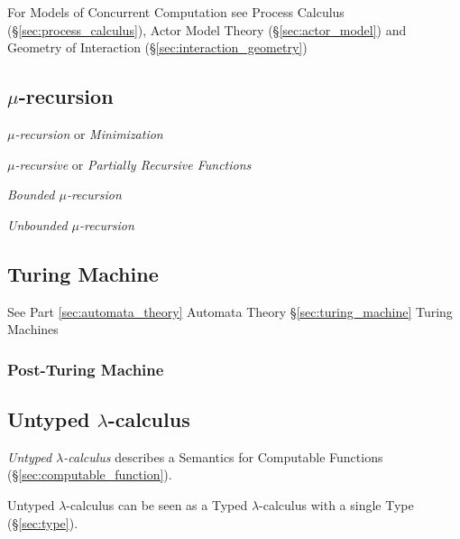 \fist For Models of Concurrent Computation see Process Calculus
(\S\ref{sec:process_calculus}), Actor Model Theory
(\S\ref{sec:actor_model}) and Geometry of Interaction
(\S\ref{sec:interaction_geometry})



\subsection{$\mu$-recursion}\label{sec:mu_recursion}

\emph{$\mu$-recursion} or \emph{Minimization}

\emph{$\mu$-recursive} or \emph{Partially Recursive Functions}

\emph{Bounded $\mu$-recursion}

\emph{Unbounded $\mu$-recursion}



\subsection{Turing Machine}

See Part \ref{sec:automata_theory} Automata Theory
\S\ref{sec:turing_machine} Turing Machines



\subsubsection{Post-Turing Machine}\label{sec:post_turing}



\subsection{Untyped $\lambda$-calculus}\label{sec:untyped_lambda}

\emph{Untyped $\lambda$-calculus} describes a Semantics for Computable
Functions (\S\ref{sec:computable_function}).

Untyped $\lambda$-calculus can be seen as a Typed $\lambda$-calculus
with a single Type (\S\ref{sec:type}).


